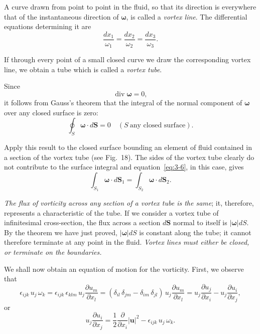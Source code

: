 A curve drawn from point to point in the fluid, so that its direction is everywhere that of the instantaneous direction of $\boldsymbol{\omega}$, is called a \emph{vortex line}. The differential equations determining it are
\begin{equation}\label{eq:3-4}
\frac{dx_1}{\omega_1} = \frac{dx_2}{\omega_2} = \frac{dx_3}{\omega_3}.
\end{equation}

If through every point of a small closed curve we draw the corresponding vortex line, we obtain a tube which is called a \emph{vortex tube}.

Since
\begin{equation}\label{eq:3-5}
\operatorname{div} \boldsymbol{\omega} = 0,
\end{equation}
it follows from Gauss's theorem that the integral of the normal component of $\boldsymbol{\omega}$ over any closed surface is zero:
\begin{equation}\label{eq:3-6}
\oint_S \boldsymbol{\omega} \cdot d\mathbf{S} = 0 \quad (S\ \text{any closed surface}).
\end{equation}

Apply this result to the closed surface bounding an element of fluid contained in a section of the vortex tube (see Fig.~18). The sides of the vortex tube clearly do not contribute to the surface integral and equation~\eqref{eq:3-6}, in this case, gives
\begin{equation}\label{eq:3-7}
\int_{S_1} \boldsymbol{\omega} \cdot d\mathbf{S}_1 = \int_{S_2} \boldsymbol{\omega} \cdot d\mathbf{S}_2.
\end{equation}


\emph{The flux of vorticity across any section of a vortex tube is the same}; it, therefore, represents a characteristic of the tube. If we consider a vortex tube of infinitesimal cross-section, the flux across a section $d\mathbf{S}$ normal to itself is $|\boldsymbol{\omega}|dS$. By the theorem we have just proved, $|\boldsymbol{\omega}|dS$ is constant along the tube; it cannot therefore terminate at any point in the fluid. \emph{Vortex lines must either be closed, or terminate on the boundaries.}

We shall now obtain an equation of motion for the vorticity. First, we observe that
\begin{equation}\label{eq:3-8}
\epsilon_{ijk}\, u_j\, \omega_k = \epsilon_{ijk}\,\epsilon_{klm}\, u_j \frac{\partial u_m}{\partial x_l}
= (\delta_{il}\,\delta_{jm} - \delta_{im}\,\delta_{jl})\, u_j \frac{\partial u_m}{\partial x_l}
= u_j\frac{\partial u_j}{\partial x_i} - u_j\frac{\partial u_i}{\partial x_j},
\end{equation}
or
\begin{equation}\label{eq:3-9}
u_j\frac{\partial u_i}{\partial x_j} = \frac{1}{2}\frac{\partial}{\partial x_i}|\mathbf{u}|^2 - \epsilon_{ijk}\, u_j\, \omega_k.
\end{equation}

